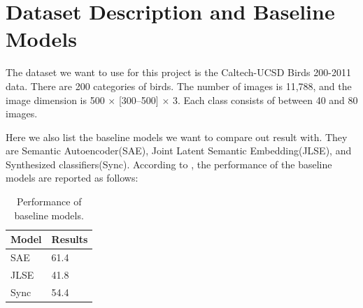 \documentclass{article}
\newcommand{\bb}[1]{\boldsymbol{#1}}
\begin{document}






\section{Dataset Description and Baseline Models}

The dataset we want to use for this project is the Caltech-UCSD Birds 200-2011 data\cite{wah2011caltech}. There are 200 categories of birds. The number of images is 11,788, and the image dimension is 500 $\times$ [300--500] $\times$ 3. Each class consists of between 40 and 80 images. 

Here we also list the baseline models we want to compare out result with. They are Semantic Autoencoder(SAE)\cite{kodirov2017semantic}, Joint Latent Semantic Embedding(JLSE)\cite{zhang2016zero}, and Synthesized classifiers(Sync)\cite{changpinyo2016synthesized}. According to \cite{kodirov2017semantic}, the performance of the baseline models are reported as follows:
\begin{table}[!htb]
 \centering
 \begin{tabular}{|l|l|}
  \hline
  Model & Results \\
  \hline
  SAE\cite{kodirov2017semantic} & 61.4 \\
  \hline
  JLSE\cite{zhang2016zero} & 41.8 \\
  \hline
  Sync\cite{changpinyo2016synthesized} & 54.4 \\
  \bottomrule
 \end{tabular}
 \caption{Performance of baseline models.}
\end{table}
\end{document}
